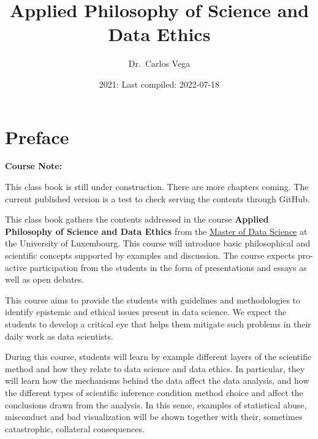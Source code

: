 \documentclass[
]{book}
\title{Applied Philosophy of Science and Data Ethics}
\author{Dr.~Carlos Vega}
\date{2021: Last compiled: 2022-07-18}
\let\oldmaketitle\maketitle
\begin{document}
\maketitle

\thispagestyle{empty}


\let\maketitle\oldmaketitle
\maketitle

{
\hypersetup{linkcolor=}
\setcounter{tocdepth}{3}
\tableofcontents
}
\hypertarget{preface}{%
\chapter*{Preface}\label{preface}}

\begin{notebox}

\begin{center}
\textbf{Course Note:}

\end{center}

This class book is still under construction. There are more chapters coming. The current published version is a test to check serving the contents through GitHub.

\end{notebox}

This class book gathers the contents addressed in the course \textbf{Applied Philosophy of Science and Data Ethics} from the \href{https://wwwfr.uni.lu/formations/fstm/master_of_data_science}{Master of Data Science} at the University of Luxembourg. This course will introduce basic philosophical and scientific concepts supported by examples and discussion. The course expects pro-active participation from the students in the form of presentations and essays as well as open debates.

This course aims to provide the students with guidelines and methodologies to identify epistemic and ethical issues present in data science. We expect the students to develop a critical eye that helps them mitigate such problems in their daily work as data scientists.

During this course, students will learn by example different layers of the scientific method and how they relate to data science and data ethics. In particular, they will learn how the mechanisms behind the data affect the data analysis, and how the different types of scientific inference condition method choice and affect the conclusions drawn from the analysis. In this sense, examples of statistical abuse, misconduct and bad visualization will be shown together with their, sometimes catastrophic, collateral consequences.
\end{document}
